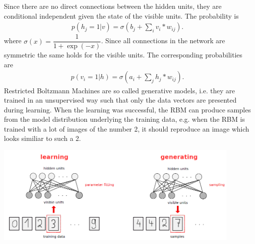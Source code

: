 \documentclass[a4paper]{scrartcl}
\begin{document}
Since there are no direct connections between the hidden units, they are conditional independent given the state of the visible units. The probability is
\begin{align}
p(h_j = 1|v) = \sigma(b_j + \sum_i v_i*w_{ij}).
\end{align}
where $\sigma(x) = \dfrac{1}{1+\exp(-x)}$. Since all connections in the network are symmetric the same holds for the visible units. The corresponding probabilities are
\begin{align}
p(v_i = 1|h) = \sigma(a_i + \sum_j h_j*w_{ij}).
\end{align}
Restricted Boltzmann Machines are so called generative models, i.e. they are trained in an unsupervised way such that only the data vectors are presented during learning. When the learning was successful, the RBM can produce samples from the model distribution underlying the training data, e.g. when the RBM is trained with a lot of images of the number 2, it should reproduce an image which looks similiar to such a 2.
\begin{center}
\includegraphics[width=12cm]{images/generativeRBM.png}
\end{center}
\end{document}
